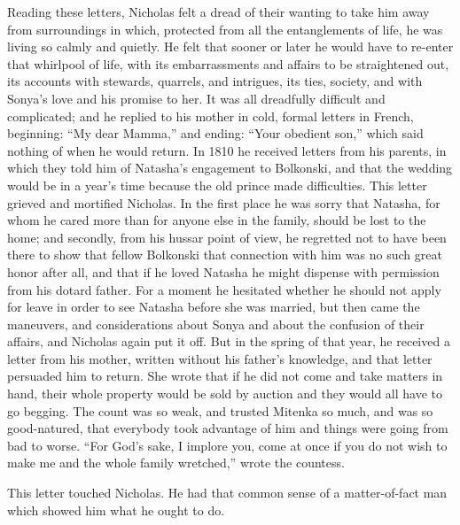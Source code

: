 Reading these letters, Nicholas felt a dread of their wanting to
take him away from surroundings in which, protected from all the
entanglements of life, he was living so calmly and quietly. He
felt that sooner or later he would have to re-enter that
whirlpool of life, with its embarrassments and affairs to be
straightened out, its accounts with stewards, quarrels, and
intrigues, its ties, society, and with Sonya's love and his
promise to her. It was all dreadfully difficult and complicated;
and he replied to his mother in cold, formal letters in French,
beginning: ``My dear Mamma,'' and ending: ``Your obedient son,''
which said nothing of when he would return. In 1810 he received
letters from his parents, in which they told him of Natasha's
engagement to Bolkonski, and that the wedding would be in a
year's time because the old prince made difficulties. This letter
grieved and mortified Nicholas. In the first place he was sorry
that Natasha, for whom he cared more than for anyone else in the
family, should be lost to the home; and secondly, from his hussar
point of view, he regretted not to have been there to show that
fellow Bolkonski that connection with him was no such great honor
after all, and that if he loved Natasha he might dispense with
permission from his dotard father. For a moment he hesitated
whether he should not apply for leave in order to see Natasha
before she was married, but then came the maneuvers, and
considerations about Sonya and about the confusion of their
affairs, and Nicholas again put it off. But in the spring of that
year, he received a letter from his mother, written without his
father's knowledge, and that letter persuaded him to return. She
wrote that if he did not come and take matters in hand, their
whole property would be sold by auction and they would all have
to go begging. The count was so weak, and trusted Mitenka so
much, and was so good-natured, that everybody took advantage of
him and things were going from bad to worse. ``For God's sake, I
implore you, come at once if you do not wish to make me and the
whole family wretched,'' wrote the countess.

This letter touched Nicholas. He had that common sense of a
matter-of-fact man which showed him what he ought to do.

